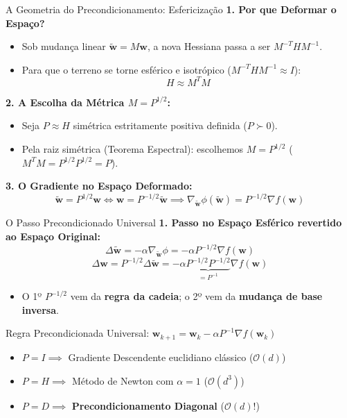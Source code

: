 \documentclass[aspectratio=169, 10pt]{beamer}
\newenvironment{calloutnote}[1][Nota]{%
  \begin{block}{#1}%
}{%
  \end{block}%
}
\begin{document}
\begin{frame}{A Geometria do Precondicionamento: Esfericização}
  \textbf{1. Por que Deformar o Espaço?}
  \begin{itemize}
    \item Sob mudança linear $\tilde{\mathbf{w}} = M\mathbf{w}$, a nova Hessiana passa a ser $M^{-T} H M^{-1}$.
    \item Para que o terreno se torne esférico e isotrópico ($M^{-T} H M^{-1} \approx I$):
    \[H \approx M^T M\]
  \end{itemize}
  \vspace{0.2cm}
  \textbf{2. A Escolha da Métrica $M = P^{1/2}$:}
  \begin{itemize}
    \item Seja $P \approx H$ simétrica estritamente positiva definida ($P \succ 0$).
    \item Pela raiz simétrica (Teorema Espectral): escolhemos $M = P^{1/2}$ ($M^T M = P^{1/2} P^{1/2} = P$).
  \end{itemize}
  \vspace{0.2cm}
  \textbf{3. O Gradiente no Espaço Deformado:}
  \[\tilde{\mathbf{w}} = P^{1/2} \mathbf{w} \iff \mathbf{w} = P^{-1/2} \tilde{\mathbf{w}} \implies \nabla_{\tilde{\mathbf{w}}} \phi(\tilde{\mathbf{w}}) = P^{-1/2} \nabla f(\mathbf{w})\]
\end{frame}

\begin{frame}{O Passo Precondicionado Universal}
  \textbf{1. Passo no Espaço Esférico revertido ao Espaço Original:}
  \[\Delta\tilde{\mathbf{w}} = -\alpha \nabla_{\tilde{\mathbf{w}}} \phi = -\alpha P^{-1/2} \nabla f(\mathbf{w})\]
  \[\Delta\mathbf{w} = P^{-1/2} \Delta\tilde{\mathbf{w}} = -\alpha \underbrace{P^{-1/2} P^{-1/2}}_{= P^{-1}} \nabla f(\mathbf{w})\]
  \begin{itemize}
    \item O 1º $P^{-1/2}$ vem da \textbf{regra da cadeia}; o 2º vem da \textbf{mudança de base inversa}.
  \end{itemize}
  \vspace{0.3cm}
  \begin{calloutnote}[Regra Precondicionada Universal: $\mathbf{w}_{k+1} = \mathbf{w}_k - \alpha P^{-1} \nabla f(\mathbf{w}_k)$]
    \begin{itemize}
      \item $P = I \implies$ Gradiente Descendente euclidiano clássico ($\mathcal{O}(d)$)
      \item $P = H \implies$ Método de Newton com $\alpha = 1$ ($\mathcal{O}(d^3)$)
      \item $P = D \implies$ \textbf{Precondicionamento Diagonal} ($\mathcal{O}(d)$!)
    \end{itemize}
  \end{calloutnote}
\end{frame}
\end{document}

